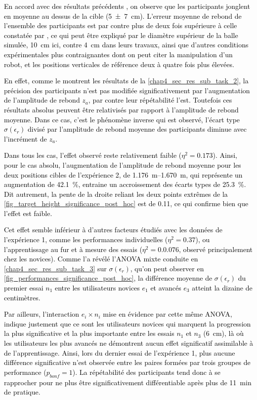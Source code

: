 \textcolor{black}{En accord avec des résultats précédents \parencite{siegler_passive_2010}, on observe que les participants jonglent en moyenne au dessus de la cible (\SI{5(7)}{\centi\meter}). L'erreur moyenne de rebond de l'ensemble des participants est par contre plus de deux fois supérieure à celle constatée par \textcite{siegler_passive_2010}, ce qui peut être expliqué par le diamètre supérieur de la balle simulée, \SI{10}{\centi\meter} ici, contre \SI{4}{\centi\meter} dans leurs travaux, ainsi que d'autres conditions expérimentales plus contraignantes dont on peut citer la manipulation d'un robot, et les positions verticales de référence deux à quatre fois plus élevées.}

\textcolor{black}{En effet, comme le montrent les résultats de la \cref{chap4_sec_res_sub_task_2}, la précision des participants n'est pas modifiée significativement par l'augmentation de l'amplitude de rebond $z_a$, par contre leur répétabilité l'est. Toutefois ces résultats absolus peuvent être relativisés par rapport à l'amplitude de rebond moyenne. Dans ce cas, c'est le phénomène inverse qui est observé, l'écart type $\sigma(\epsilon_r)$ divisé par l'amplitude de rebond moyenne des participants diminue avec l'incrément de $z_a$.}

\textcolor{black}{Dans tous les cas, l'effet observé reste relativement faible ($\eta^2=0.173$). Ainsi, pour le cas absolu, l'augmentation de l'amplitude de rebond moyenne pour les deux positions cibles de l'expérience 2, de \SIrange{1.176}{1.670}{\meter}, qui représente un augmentation de \SI{42.1}{\percent}, entraine un accroissement des écarts types de \SI{25.3}{\percent}. Dit autrement, la pente de la droite reliant les deux points extrêmes de la \cref{fig_target_height_significance_post_hoc} est de 0.11, ce qui confirme bien que l'effet est faible.}

\textcolor{black}{Cet effet semble inférieur à d'autres facteurs étudiés avec les données de l'expérience 1, comme les performances individuelles ($\eta^2=0.37$), ou l'apprentissage au fur et à mesure des essais ($\eta^2=0.0.076$, observé principalement chez les novices). Comme l'a révélé l'ANOVA mixte conduite en \cref{chap4_sec_res_sub_task_3} sur $\sigma(\epsilon_r)$, qu'on peut observer en \cref{fig_performances_significance_post_hoc}, la différence moyenne de $\sigma(\epsilon_r)$ du premier essai $n_1$ entre les utilisateurs novices $e_1$ et avancés $e_3$ atteint la dizaine de centimètres.}

\textcolor{black}{Par ailleurs, l'interaction $e_i\times n_i$ mise en évidence par cette même ANOVA, indique justement que ce sont les utilisateurs novices qui marquent la progression la plus significative et la plus importante entre les essais $n_1$ et $n_3$ (\SI{6}{\centi\meter}), là où les utilisateurs les plus avancés ne démontrent aucun effet significatif assimilable à de l'apprentissage. Ainsi, lors du dernier essai de l'expérience 1, plus aucune différence significative n'est observée entre les paires formées par trois groupes de performance ($p_{bonf}=1$). La répétabilité des participants tend donc à se rapprocher pour ne plus être significativement différentiable après plus de \SI{11}{\minute} de pratique.}

